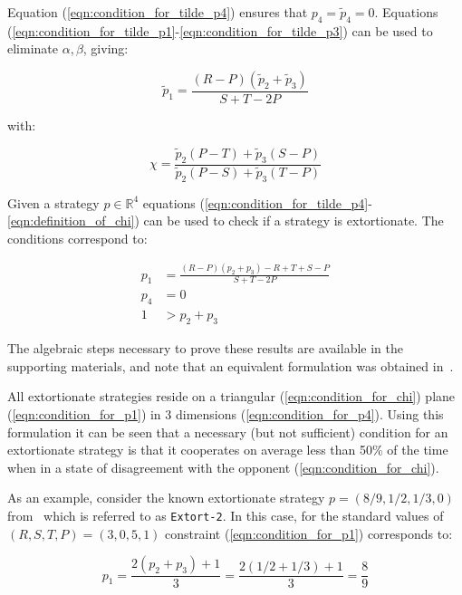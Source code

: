 \documentclass[a4paper]{article}
\begin{document}
Equation (\ref{eqn:condition_for_tilde_p4}) ensures that \(p_4=\tilde p_4=0\).
Equations (\ref{eqn:condition_for_tilde_p1}-\ref{eqn:condition_for_tilde_p3})
can be used to eliminate \(\alpha, \beta\), giving:

\begin{equation}\label{eqn:planar_definition_of_extortion}
    \tilde p_1 = \frac{(R - P)(\tilde p_2 + \tilde p_3)}{S + T - 2P}
\end{equation}

with:

\begin{equation}\label{eqn:definition_of_chi}
    \chi = \frac{\tilde p_2 (P - T) + \tilde p_3 (S - P)}
                {\tilde p_2 (P - S) + \tilde p_3 (T - P)}
\end{equation}

Given a strategy \(p\in\mathbb{R}^{4}\) equations
(\ref{eqn:condition_for_tilde_p4}-\ref{eqn:definition_of_chi}) can be used to
check if a strategy is extortionate. The conditions correspond to:

\begin{align}
    p_1 & = \frac{(R-P)(p_2 + p_3) - R + T + S - P}{S + T - 2P}
     \label{eqn:condition_for_p1}\\
    p_4 & = 0 \label{eqn:condition_for_p4}\\
    1 & > p_2 + p_3\label{eqn:condition_for_chi}
\end{align}

The algebraic steps necessary to prove these results are available in the
supporting materials, and note that an equivalent formulation was obtained
in~\cite{adami2013evolutionary}.

All extortionate strategies reside on a triangular (\ref{eqn:condition_for_chi})
plane (\ref{eqn:condition_for_p1}) in 3 dimensions (\ref{eqn:condition_for_p4}).
Using this formulation it can be seen that a necessary (but not sufficient)
condition for an extortionate strategy is that it cooperates on average less
than 50\% of the time when in a state of disagreement with the opponent
(\ref{eqn:condition_for_chi}).

As an example, consider the known extortionate strategy \(p=(8 / 9, 1 / 2, 1 /
3, 0)\) from~\cite{Stewart2012} which is referred to as \texttt{Extort-2}. In
this case, for the standard values of \((R, S, T, P) = (3, 0, 5, 1)\)
constraint (\ref{eqn:condition_for_p1}) corresponds to:

\begin{equation}
    p_1 = \frac{2(p_2 + p_3) + 1}{3}
        = \frac{2(1 / 2 + 1 / 3) + 1}{3}
        = \frac{8}{9}
\end{equation}
\end{document}
